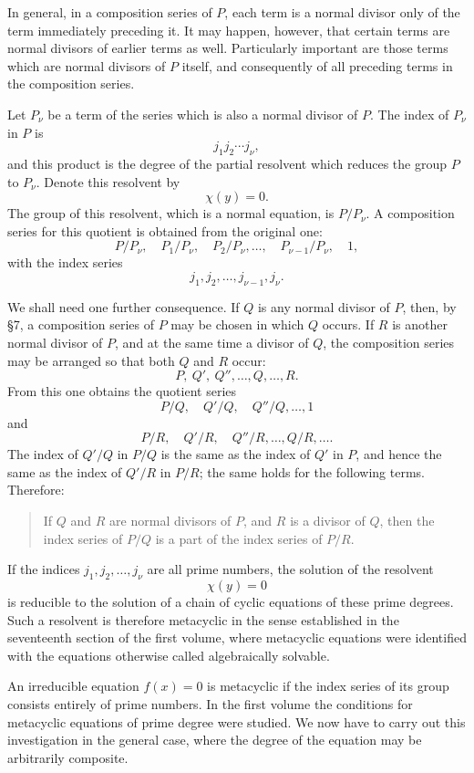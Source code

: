 \documentclass[11pt,a4paper]{book}
\begin{document}
In general, in a composition series of \(P\), each term is a normal divisor only of the term immediately preceding it.  It may happen, however, that certain terms are normal divisors of earlier terms as well.  Particularly important are those terms which are normal divisors of \(P\) itself, and consequently of all preceding terms in the composition series.

Let \(P_\nu\) be a term of the series which is also a normal divisor of \(P\).  The index of \(P_\nu\) in \(P\) is
\[
 j_1j_2\cdots j_\nu,
\]
and this product is the degree of the partial resolvent which reduces the group \(P\) to \(P_\nu\).  Denote this resolvent by
\[
 \chi(y)=0.
\]
The group of this resolvent, which is a normal equation, is \(P/P_\nu\).  A composition series for this quotient is obtained from the original one:
\[
 P/P_\nu,\quad P_1/P_\nu,\quad P_2/P_\nu,\ldots,\quad
 P_{\nu-1}/P_\nu,\quad 1,
\]
with the index series
\[
 j_1,j_2,\ldots,j_{\nu-1},j_\nu .
\]

We shall need one further consequence.  If \(Q\) is any normal divisor of \(P\), then, by \S 7, a composition series of \(P\) may be chosen in which \(Q\) occurs.  If \(R\) is another normal divisor of \(P\), and at the same time a divisor of \(Q\), the composition series may be arranged so that both \(Q\) and \(R\) occur:
\[
 P,\ Q',\ Q'',\ldots,Q,\ldots,R .
\]
From this one obtains the quotient series
\[
 P/Q,\quad Q'/Q,\quad Q''/Q,\ldots,1
\]
and
\[
 P/R,\quad Q'/R,\quad Q''/R,\ldots,Q/R,\ldots .
\]
The index of \(Q'/Q\) in \(P/Q\) is the same as the index of \(Q'\) in \(P\), and hence the same as the index of \(Q'/R\) in \(P/R\); the same holds for the following terms.  Therefore:

\begin{quote}
If \(Q\) and \(R\) are normal divisors of \(P\), and \(R\) is a divisor of \(Q\), then the index series of \(P/Q\) is a part of the index series of \(P/R\).
\end{quote}

If the indices \(j_1,j_2,\ldots,j_\nu\) are all prime numbers, the solution of the resolvent
\[
 \chi(y)=0
\]
is reducible to the solution of a chain of cyclic equations of these prime degrees.  Such a resolvent is therefore metacyclic in the sense established in the seventeenth section of the first volume, where metacyclic equations were identified with the equations otherwise called algebraically solvable.

An irreducible equation \(f(x)=0\) is metacyclic if the index series of its group consists entirely of prime numbers.  In the first volume the conditions for metacyclic equations of prime degree were studied.  We now have to carry out this investigation in the general case, where the degree of the equation may be arbitrarily composite.
\end{document}
